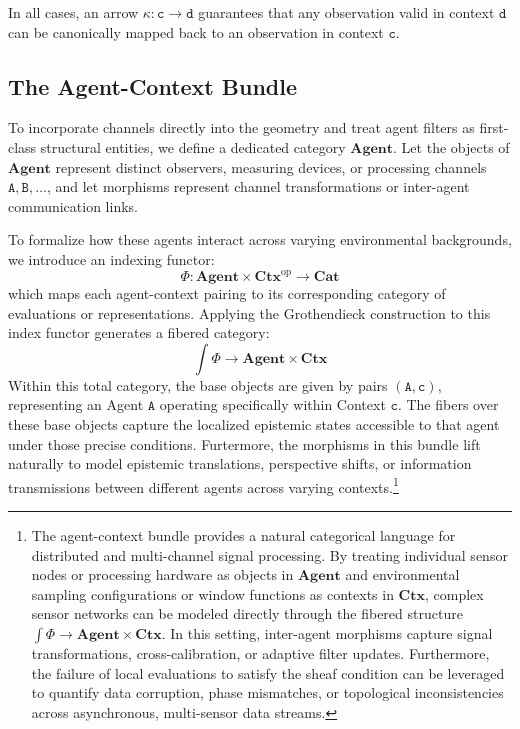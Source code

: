 \documentclass{article}
\numberwithin{tm}{section}
\numberwithin{dn}{section}
\numberwithin{as}{section}
\numberwithin{rk}{section}
\numberwithin{lem}{section}
\numberwithin{ax}{section}
\numberwithin{pp}{section}
\numberwithin{eg}{section}
\numberwithin{war}{section}
\numberwithin{equation}{section}
\numberwithin{prop}{section}
\numberwithin{nt}{section}
\numberwithin{rc}{section}
\def\code#1{\texttt{#1}}
\begin{document}
In all cases, an arrow $\kappa: \code{c} \to \code{d}$ guarantees that any observation valid in context $\code{d}$ can be canonically mapped back to an observation in context $\code{c}$.

\subsection*{The Agent-Context Bundle}

To incorporate channels directly into the geometry and treat agent filters as first-class structural entities, we define a dedicated category $\mathbf{Agent}$. Let the objects of $\mathbf{Agent}$ represent distinct observers, measuring devices, or processing channels $\code{A}, \code{B}, \dots$, and let morphisms represent channel transformations or inter-agent communication links. 

To formalize how these agents interact across varying environmental backgrounds, we introduce an indexing functor:
\[
\Phi: \mathbf{Agent} \times \mathbf{Ctx}^{\text{op}} \longrightarrow \mathbf{Cat}
\]
which maps each agent-context pairing to its corresponding category of evaluations or representations. Applying the Grothendieck construction to this index functor generates a fibered category:
\[
\int \Phi \longrightarrow \mathbf{Agent} \times \mathbf{Ctx}
\]
Within this total category, the base objects are given by pairs $(\code{A}, \code{c})$, representing an Agent $\code{A}$ operating specifically within Context $\code{c}$. The fibers over these base objects capture the localized epistemic states accessible to that agent under those precise conditions. Furtermore, the morphisms in this bundle lift naturally to model epistemic translations, perspective shifts, or information transmissions between different agents across varying contexts.\footnote{The agent-context bundle provides a natural categorical language for distributed and multi-channel signal processing. By treating individual sensor nodes or processing hardware as objects in $\mathbf{Agent}$ and environmental sampling configurations or window functions as contexts in $\mathbf{Ctx}$, complex sensor networks can be modeled directly through the fibered structure $\int \Phi \longrightarrow \mathbf{Agent} \times \mathbf{Ctx}$. In this setting, inter-agent morphisms capture signal transformations, cross-calibration, or adaptive filter updates. Furthermore, the failure of local evaluations to satisfy the sheaf condition can be leveraged to quantify data corruption, phase mismatches, or topological inconsistencies across asynchronous, multi-sensor data streams.}
\end{document}

